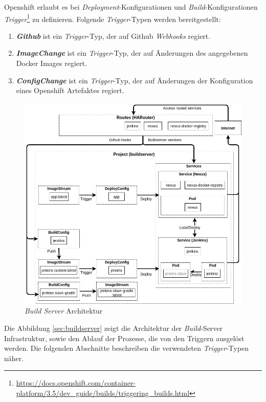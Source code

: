 \pagebreak

Openshift erlaubt es bei \emph{Deployment}-Konfigurationen und \emph{Build}-Konfigurationen \emph{Trigger}\footnote{\url{https://docs.openshift.com/container-platform/3.5/dev_guide/builds/triggering_builds.html}} zu definieren. Folgende \emph{Trigger}-Typen werden bereitgestellt:
\begin{enumerate}
	\item\textbf{\emph{Github}} ist ein \emph{Trigger}-Typ, der auf Github \emph{Webhooks} regiert.
	\item\textbf{\emph{ImageChange}} ist ein \emph{Trigger}-Typ, der auf Änderungen des angegebenen Docker Images regiert.
	\item\textbf{\emph{ConfigChange}} ist ein \emph{Trigger}-Typ, der auf Änderungen der Konfiguration eines Openshift Artefaktes regiert.
\end{enumerate}

\begin{figure}[H]
	\centering
	\includegraphics[scale=0.5]{logos/architecture-diagram-buildserver.jpg}
	\caption{\emph{Build Server} Architektur}
	\label{fig:architecture}
\end{figure}

Die Abbildung \ref{sec:buildserver} zeigt die Architektur der \emph{Build}-Server Infrastruktur, sowie den Ablauf der Prozesse, die von den Triggern ausgelöst werden. Die folgenden Abschnitte beschreiben die verwendeten \emph{Trigger}-Typen näher.

